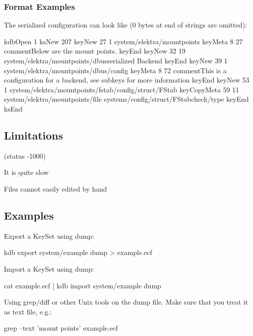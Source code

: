 \subsubsection*{Format Examples}

The serialized configuration can look like (0 bytes at end of strings are omitted)\+:


\begin{DoxyCode}
kdbOpen 1
ksNew 207
keyNew 27 1
system/elektra/mountpoints
keyMeta 8 27
commentBelow are the mount points.
keyEnd
keyNew 32 19
system/elektra/mountpoints/dbusserialized Backend
keyEnd keyNew 39 1
system/elektra/mountpoints/dbus/config
keyMeta 8 72
commentThis is a configuration for a backend, see subkeys for more information
keyEnd
keyNew 53 1
system/elektra/mountpoints/fstab/config/struct/FStab
keyCopyMeta 59 11
system/elektra/mountpoints/file
systems/config/struct/FStabcheck/type
keyEnd
ksEnd
\end{DoxyCode}


\subsection*{Limitations}

(status -\/1000)


\begin{DoxyItemize}
\item It is quite slow
\item Files cannot easily edited by hand
\end{DoxyItemize}

\subsection*{Examples}

Export a Key\+Set using {\ttfamily dump}\+:


\begin{DoxyCode}
kdb export system/example dump > example.ecf
\end{DoxyCode}


Import a Key\+Set using {\ttfamily dump}\+:


\begin{DoxyCode}
cat example.ecf | kdb import system/example dump
\end{DoxyCode}


Using grep/diff or other Unix tools on the dump file. Make sure that you treat it as text file, e.\+g.\+:


\begin{DoxyCode}
grep --text 'mount points' example.ecf
\end{DoxyCode}
 